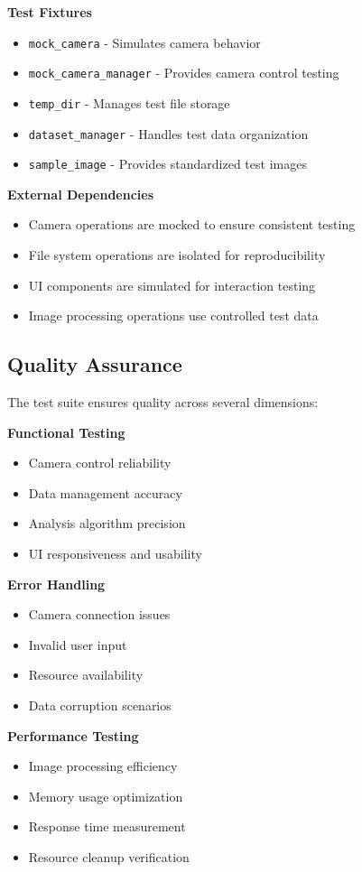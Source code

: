\textbf{Test Fixtures}
\begin{itemize}
    \item \texttt{mock\_camera} - Simulates camera behavior
    \item \texttt{mock\_camera\_manager} - Provides camera control testing
    \item \texttt{temp\_dir} - Manages test file storage
    \item \texttt{dataset\_manager} - Handles test data organization
    \item \texttt{sample\_image} - Provides standardized test images
\end{itemize}

\textbf{External Dependencies}
\begin{itemize}
    \item Camera operations are mocked to ensure consistent testing
    \item File system operations are isolated for reproducibility
    \item UI components are simulated for interaction testing
    \item Image processing operations use controlled test data
\end{itemize}

\subsection{Quality Assurance}
The test suite ensures quality across several dimensions:

\textbf{Functional Testing}
\begin{itemize}
    \item Camera control reliability
    \item Data management accuracy
    \item Analysis algorithm precision
    \item UI responsiveness and usability
\end{itemize}

\textbf{Error Handling}
\begin{itemize}
    \item Camera connection issues
    \item Invalid user input
    \item Resource availability
    \item Data corruption scenarios
\end{itemize}

\textbf{Performance Testing}
\begin{itemize}
    \item Image processing efficiency
    \item Memory usage optimization
    \item Response time measurement
    \item Resource cleanup verification
\end{itemize}

